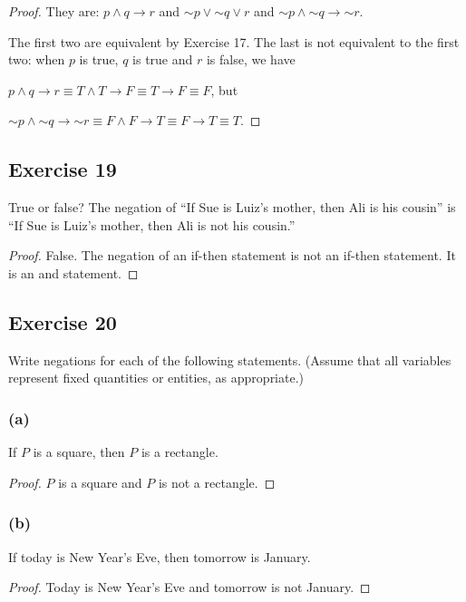 \documentclass[14pt]{extarticle}
\begin{document}
\begin{proof} 
They are: $p \wedge q \to r$ and ${\sim p} \vee {\sim q} \vee r$ and ${\sim p} \wedge {\sim q} \to {\sim r}$.

The first two are equivalent by Exercise 17. The last is not equivalent to the first two: when $p$ is true, $q$ is true and $r$ is false, we have

$p \wedge q \to r \equiv T \wedge T \to F \equiv T \to F \equiv F$, but 

${\sim p} \wedge {\sim q} \to {\sim r} \equiv F \wedge F \to T \equiv F \to T \equiv T$. 
\end{proof}

\subsection{Exercise 19} True or false? The negation of “If Sue is Luiz’s mother, then Ali is his cousin” is “If Sue is Luiz’s mother, then Ali is not his cousin.”

\begin{proof} 
False. The negation of an if-then statement is not an if-then
statement. It is an and statement. 
\end{proof}

\subsection{Exercise 20} 
Write negations for each of the following statements. (Assume that all variables represent fixed quantities or entities, as
appropriate.)

\subsubsection{(a)} 
If $P$ is a square, then $P$ is a rectangle.

\begin{proof} 
$P$ is a square and $P$ is not a rectangle. 
\end{proof}

\subsubsection{(b)} 
If today is New Year’s Eve, then tomorrow is January.

\begin{proof} 
Today is New Year’s Eve and tomorrow is not January. 
\end{proof}
\end{document}
